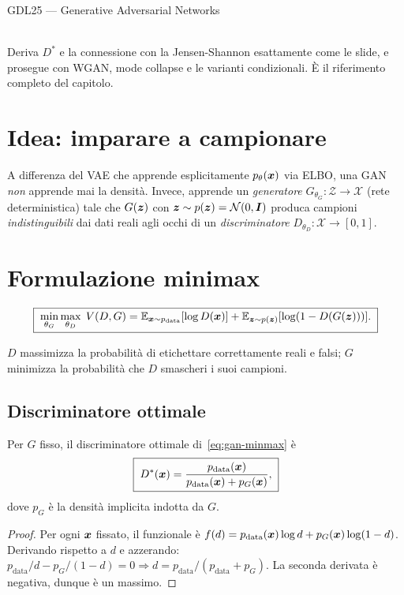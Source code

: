 \begin{risorsevideo}{GDL25 — Generative Adversarial Networks}

\medskip
{}\\
Deriva $D^*$ e la connessione con la Jensen-Shannon esattamente come le slide, e prosegue con WGAN, mode collapse e le varianti condizionali. È il riferimento completo del capitolo.
\end{risorsevideo}

\section{Idea: imparare a campionare}

A differenza del VAE che apprende esplicitamente $p_\theta(\bm{x})$ via ELBO, una GAN \emph{non} apprende mai la densità. Invece, apprende un \emph{generatore} $G_{\theta_G}: \mathcal{Z} \to \mathcal{X}$ (rete deterministica) tale che $G(\bm{z})$ con $\bm{z} \sim p(\bm{z}) = \mathcal{N}(0,\bm{I})$ produca campioni \emph{indistinguibili} dai dati reali agli occhi di un \emph{discriminatore} $D_{\theta_D}: \mathcal{X} \to [0,1]$.

\section{Formulazione minimax}

\begin{equation}\label{eq:gan-minmax}
\boxed{\;\min_{\theta_G} \max_{\theta_D}\; V(D, G) = \mathbb{E}_{\bm{x}\sim p_{\text{data}}}[\log D(\bm{x})] + \mathbb{E}_{\bm{z}\sim p(\bm{z})}[\log(1 - D(G(\bm{z})))].\;}
\end{equation}

$D$ massimizza la probabilità di etichettare correttamente reali e falsi; $G$ minimizza la probabilità che $D$ smascheri i suoi campioni.

\subsection{Discriminatore ottimale}

\begin{theorem}[Goodfellow et al.\ 2014]
Per $G$ fisso, il discriminatore ottimale di~\eqref{eq:gan-minmax} è
\[
\boxed{\;D^*(\bm{x}) = \frac{p_{\text{data}}(\bm{x})}{p_{\text{data}}(\bm{x}) + p_G(\bm{x})},\;}
\]
dove $p_G$ è la densità implicita indotta da $G$.
\end{theorem}
\begin{proof}
Per ogni $\bm{x}$ fissato, il funzionale è $f(d) = p_{\text{data}}(\bm{x})\log d + p_G(\bm{x})\log(1-d)$. Derivando rispetto a $d$ e azzerando: $p_{\text{data}}/d - p_G/(1-d) = 0 \Rightarrow d = p_{\text{data}}/(p_{\text{data}} + p_G)$. La seconda derivata è negativa, dunque è un massimo.
\end{proof}

